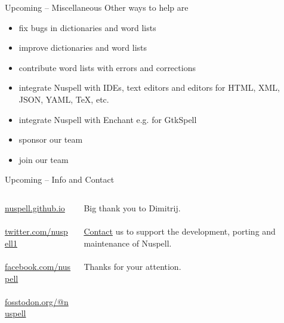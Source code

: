 \documentclass{beamer}
\begin{document}
\begin{frame}{Upcoming – Miscellaneous}
Other ways to help are
\begin{itemize}
\item fix bugs in dictionaries and word lists
\item improve dictionaries and word lists
\item contribute word lists with errors and corrections
\item integrate Nuspell with IDEs, text editors and editors for HTML, XML, JSON, YAML, \TeX{}, etc.
\item integrate Nuspell with Enchant e.g. for GtkSpell
\item sponsor our team
\item join our team
\end{itemize}
\end{frame}

\begin{frame}{Upcoming – Info and Contact}
\begin{columns}
\begin{column}{0.5\textwidth}
\href{https://nuspell.github.io}{nuspell.github.io}
\\\mbox{}\\
\href{https://twitter.com/nuspell1}{twitter.com/nuspell1}
\\\mbox{}\\
\href{https://facebook.com/nuspell}{facebook.com/nuspell}
\\\mbox{}\\
\href{https://fosstodon.org/@nuspell}{fosstodon.org/@nuspell}
\end{column}
\begin{column}{0.5\textwidth}
Big thank you to Dimitrij.
\\\mbox{}\\
\href{mailto:sander@hellebaard.nl?subject=Nuspell}{Contact} us to support the development, porting and maintenance of Nuspell.
\\\mbox{}\\
Thanks for your attention.
\end{column}
\end{columns}
\end{frame}
\end{document}
